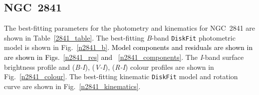 \documentclass[a4paper,fleqn,usenatbib]{mnras}
\newcommand{\authorfix}{\textcolor{black}}
\begin{document}
\subsection{NGC~2841}
\label{sec:n2841}

The best-fitting parameters for the photometry and kinematics for NGC~2841 are shown in Table~\ref{2841_table}. The best-fitting \textit{B}-band \texttt{DiskFit} photometric model is shown in Fig.~\ref{n2841_b}. \authorfix{Model components and residuals are shown in are shown in Figs.~\ref{n2841_res} and ~\ref{n2841_components}}. The \textit{I}-band surface brightness profile and (\textit{B-I}), (\textit{V-I}), (\textit{R-I}) colour profiles are shown in  Fig.~\ref{n2841_colour}. The best-fitting kinematic \texttt{DiskFit} model and rotation curve are shown in Fig.~\ref{n2841_kinematics}.
\end{document}
